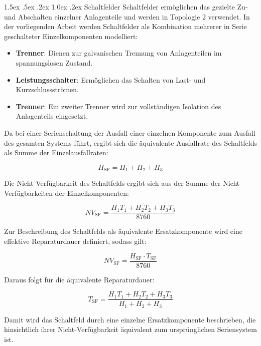 \documentclass[a4paper,12pt]{article}
\makeatletter
\renewcommand\paragraph{\@startsection{paragraph}{4}{\z@}%
	{1.5ex \@plus .5ex \@minus .2ex}%
	{1.0ex \@plus .2ex}%
	{\normalfont\normalsize\bfseries}}%
\makeatother
\begin{document}
\paragraph{Schaltfelder}
Schaltfelder ermöglichen das gezielte Zu- und Abschalten einzelner Anlagenteile
und werden in Topologie 2 verwendet. In der vorliegenden Arbeit werden
Schaltfelder als Kombination mehrerer in Serie
geschalteter Einzelkomponenten modelliert:

\begin{itemize}
    \item \textbf{Trenner}: Dienen zur galvanischen Trennung von Anlagenteilen
        im spannungslosen Zustand.
    \item \textbf{Leistungsschalter}: Ermöglichen das Schalten von Last- und
        Kurzschlussströmen.
    \item \textbf{Trenner}: Ein zweiter Trenner wird zur vollständigen
        Isolation des Anlagenteils eingesetzt.
\end{itemize}

Da bei einer Serienschaltung der Ausfall
einer einzelnen Komponente zum Ausfall des gesamten Systems führt,
ergibt sich die äquivalente Ausfallrate des Schaltfelds als Summe der
Einzelausfallraten:

\begin{equation}
H_{\text{SF}} = H_1 + H_2 + H_3
\end{equation}

Die Nicht-Verfügbarkeit des Schaltfelds ergibt sich aus der Summe der
Nicht-Verfügbarkeiten der Einzelkomponenten:

\begin{equation}
NV_{\text{SF}} = \frac{H_1 T_1 + H_2 T_2 + H_3 T_3}{8760}
\end{equation}

Zur Beschreibung des Schaltfelds als äquivalente Ersatzkomponente wird
eine effektive Reparaturdauer definiert, sodass gilt:

\begin{equation}
NV_{\text{SF}} = \frac{H_{\text{SF}} \cdot T_{\text{SF}}}{8760}
\end{equation}

Daraus folgt für die äquivalente Reparaturdauer:

\begin{equation}
T_{\text{SF}} = \frac{H_1 T_1 + H_2 T_2 + H_3 T_3}{H_1 + H_2 + H_3}
\end{equation}

Damit wird das Schaltfeld durch eine einzelne Ersatzkomponente beschrieben,
die hinsichtlich ihrer Nicht-Verfügbarkeit äquivalent zum ursprünglichen
Seriensystem ist.
\end{document}
